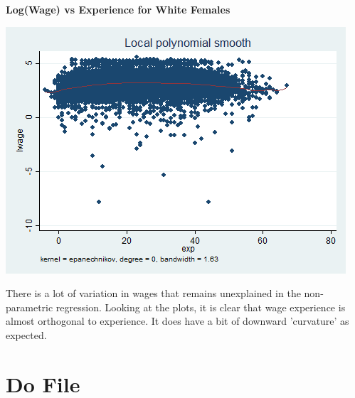 \documentclass{article}
\begin{document}
\begin{center}
\textbf{Log(Wage) vs Experience for White Females}\par\medskip
    \includegraphics[scale=.6]{../plots/q4_graph6}
\end{center}

There is a lot of variation in wages that remains unexplained in the non-parametric regression. Looking at the plots, it is clear that wage experience is almost orthogonal to experience. It does have a bit of downward 'curvature' as expected.

\section{Do File}
\end{document}
